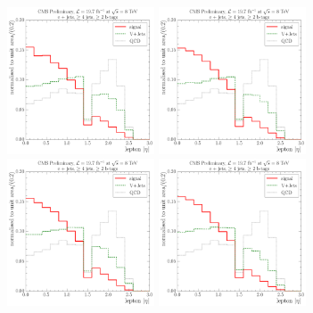 \begin{figure}[!htbp]
  \centering
    \vspace*{-0.5cm}
    \hspace*{\fill}
    {\includegraphics[width=0.39\textwidth]{measurement/WPT/central/fit_templates/electron_templates_bin_0-40}}\hfill
    {\includegraphics[width=0.39\textwidth]{measurement/WPT/central/fit_templates/electron_templates_bin_40-70}}
    \hspace*{\fill} \\
    \hspace*{\fill}
    {\includegraphics[width=0.39\textwidth]{measurement/WPT/central/fit_templates/electron_templates_bin_70-100}}\hfill
    {\includegraphics[width=0.39\textwidth]{measurement/WPT/central/fit_templates/electron_templates_bin_100-130}}

\end{figure}
